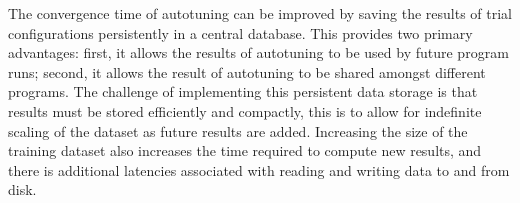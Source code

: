 The convergence time of autotuning can be improved by saving the
results of trial configurations persistently in a central
database. This provides two primary advantages: first, it allows the
results of autotuning to be used by future program runs; second, it
allows the result of autotuning to be shared amongst different
programs. The challenge of implementing this persistent data storage
is that results must be stored efficiently and compactly, this is to
allow for indefinite scaling of the dataset as future results are
added. Increasing the size of the training dataset also increases the
time required to compute new results, and there is additional
latencies associated with reading and writing data to and from disk.

